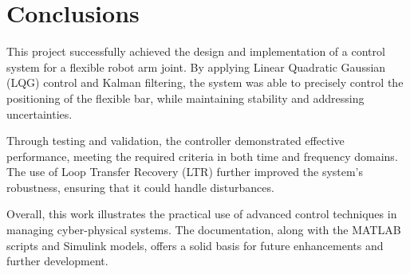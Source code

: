 \section*{Conclusions}

This project successfully achieved the design and implementation of a control system for a flexible robot arm joint. By applying Linear Quadratic Gaussian (LQG) control and Kalman filtering, the system was able to precisely control the positioning of the flexible bar, while maintaining stability and addressing uncertainties.

Through testing and validation, the controller demonstrated effective performance, meeting the required criteria in both time and frequency domains. The use of Loop Transfer Recovery (LTR) further improved the system’s robustness, ensuring that it could handle disturbances.

Overall, this work illustrates the practical use of advanced control techniques in managing cyber-physical systems. The documentation, along with the MATLAB scripts and Simulink models, offers a solid basis for future enhancements and further development.